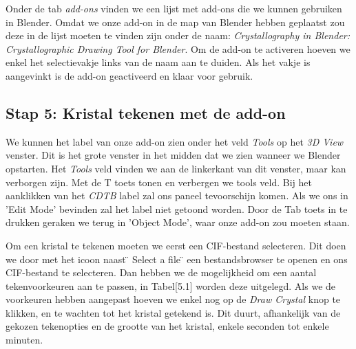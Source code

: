 Onder de tab \textit{add-ons} vinden we een lijst met add-ons die we kunnen gebruiken in Blender. Omdat we onze add-on in de map van Blender hebben geplaatst zou deze in de lijst moeten te vinden zijn onder de naam: \textit{Crystallography in Blender: Crystallographic Drawing Tool for Blender}. Om de add-on te activeren hoeven we enkel het selectievakje links van de naam aan te duiden. Als het vakje is aangevinkt is de add-on geactiveerd en klaar voor gebruik.

\subsection{Stap 5: Kristal tekenen met de add-on}
We kunnen het label van onze add-on zien onder het veld \textit{Tools} op het \textit{3D View} venster. Dit is het grote venster in het midden dat we zien wanneer we Blender opstarten. Het \textit{Tools} veld vinden we aan de linkerkant van dit venster, maar kan verborgen zijn. Met de T toets tonen en verbergen we tools veld. Bij het aanklikken van het \textit{CDTB} label zal ons paneel tevoorschijn komen. Als we ons in 'Edit Mode' bevinden zal het label niet getoond worden. Door de Tab toets in te drukken geraken we terug in 'Object Mode', waar onze add-on zou moeten staan.  
\par   


Om een kristal te tekenen moeten we eerst een CIF-bestand selecteren. Dit doen we door met het icoon naast \"{} Select a file \"{} een bestandsbrowser te openen en ons CIF-bestand te selecteren. Dan hebben we de mogelijkheid om een aantal tekenvoorkeuren aan te passen, in Tabel[5.1] worden deze uitgelegd. Als we de voorkeuren hebben aangepast hoeven we enkel nog op de \textit{Draw Crystal} knop te klikken, en te wachten tot het kristal getekend is. Dit duurt, afhankelijk van de gekozen tekenopties en de grootte van het kristal, enkele seconden tot enkele minuten.
\par

